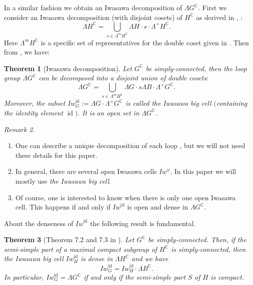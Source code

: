 \documentclass[12pt]{amsart}
\newtheorem{Theorem}{Theorem}[section]
\theoremstyle{definition}
\theoremstyle{remark}
\newtheorem{Remark}[Theorem]{Remark}
\numberwithin{equation}{section}
\begin{document}
 In a similar fashion we obtain an Iwasawa decomposition of $\Lambda G^{\mathbb C}$.
 First we consider an Iwasawa decomposition (with disjoint cosets) of 
 $H^{\mathbb C}$ as derived in \cite[Chap. 4]{Kellersch}, \cite[Theorem 6.1]{BD1}:
\begin{equation}
\Lambda H^{\mathbb C} = \bigcup_{s\in \Lambda^{m}H^{\mathbb C}}\Lambda H \cdot 
s \cdot \Lambda^+ H^{\mathbb C}.
\end{equation}
  Here $\Lambda^{m}H^{\mathbb C}$ is a specific set of representatives
 for the double coset given in \cite{OV}.
 Then from \cite[Theorem 6.5]{BD1}, we have:
  \begin{Theorem}[Iwasawa decomposition]
 \label{thm:Iwasawa}
 Let $G^{\mathbb C}$ be simply-connected, then the loop group  
 ${\Lambda G^{\mathbb C}}$ can be decomposed into a disjoint union 
 of double cosets$:$
\begin{equation*}
 {\Lambda G^{\mathbb C}}=\bigcup_{s\in \Lambda^{m}H^{\mathbb C}}
 {\Lambda G} \cdot
 s \Lambda B
 \cdot
 \Lambda^{+}G^{\mathbb C}.
\end{equation*}
 Moreover,  the subset
 $\mathit {Iw}_{G}^{\operatorname{id}}:=\Lambda{G}\cdot \Lambda^{+}G^{\mathbb C}$ 
 is called the 
 {\rm Iwasawa big cell} $($containing the identity element ${\operatorname{id}}$$)$.
 It is an open set in $\Lambda{G}^{\mathbb C}$. 
\end{Theorem}
\begin{Remark}
\mbox{}
\begin{enumerate}
\item One can describe a unique decomposition of each loop \cite{BD1}, 
 but we will not need these details for this paper.

\item In general, there  are several open Iwasawa cells $\mathit {Iw}^{\omega}$. 
 In this paper we will mostly use  \textit{the Iwasawa big cell}.

\item Of course, one is interested to know when there is only one open Iwasawa cell. This happens if and only if 
     $\mathit {Iw}^{\operatorname{id}}$ is open and dense in ${\Lambda G^{\mathbb C}}$.
\end{enumerate}
\end{Remark}
 About the denseness of $\mathit {Iw}^{\operatorname{id}}$ the following result is 
 fundamental.
 \begin{Theorem}[Theorem 7.2 and 7.3 in \cite{BD1}] Let $G^{\mathbb C}$ be simply-connected. Then,
 if the semi-simple part of a maximal 
 compact subgroup of $H^{\mathbb C}$ is simply-connected, then 
 the Iwasawa big cell $\mathit {Iw}^{\operatorname{id}}_H$ is dense in 
 $\Lambda{H}^\mathbb{C}$ and we have 
\begin{equation*}
 \mathit {Iw}^{\operatorname{id}}_G=\mathit {Iw}^{\operatorname{id}}_{H}\cdot \Lambda{B}^{\mathbb C}.
\end{equation*}
 In particular, $\mathit {Iw}^{\operatorname{id}}_G=\Lambda{G}^{\mathbb C}$ if and only if 
 the semi-simple part $S$ of $H$ is compact.
 \end{Theorem}
\end{document}
